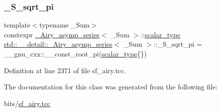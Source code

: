 \subsubsection{\texorpdfstring{\+\_\+\+S\+\_\+sqrt\+\_\+pi}{\_S\_sqrt\_pi}}
{\footnotesize\ttfamily template$<$typename \+\_\+\+Sum$>$ \\
constexpr \hyperlink{classstd_1_1____detail_1_1__Airy__asymp__series}{\+\_\+\+Airy\+\_\+asymp\+\_\+series}$<$ \+\_\+\+Sum $>$\+::\hyperlink{classstd_1_1____detail_1_1__Airy__asymp__series_a17ec74b13ebc38d5531bf27cd31684fb}{scalar\+\_\+type} \hyperlink{classstd_1_1____detail_1_1__Airy__asymp__series}{std\+::\+\_\+\+\_\+detail\+::\+\_\+\+Airy\+\_\+asymp\+\_\+series}$<$ \+\_\+\+Sum $>$\+::\+\_\+\+S\+\_\+sqrt\+\_\+pi = \+\_\+\+\_\+gnu\+\_\+cxx\+::\+\_\+\+\_\+const\+\_\+root\+\_\+pi(\hyperlink{classstd_1_1____detail_1_1__Airy__asymp__series_a17ec74b13ebc38d5531bf27cd31684fb}{scalar\+\_\+type}\{\})\hspace{0.3cm}{\ttfamily [static]}}



Definition at line 2371 of file sf\+\_\+airy.\+tcc.



The documentation for this class was generated from the following file\+:\begin{DoxyCompactItemize}
\item 
bits/\hyperlink{sf__airy_8tcc}{sf\+\_\+airy.\+tcc}\end{DoxyCompactItemize}
